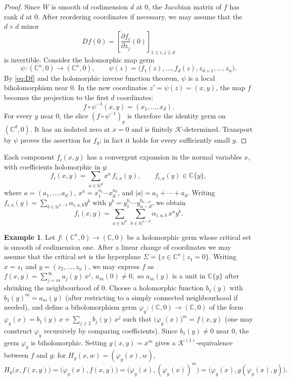 \documentclass[10pt,twoside]{amsart}
\numberwithin{equation}{section}
\theoremstyle{definition}
\newtheorem{example}[proposition]{Example}
\theoremstyle{remark}
\begin{document}
\begin{proof}
Since $W$ is smooth of codimension $d$ at $0$, the Jacobian matrix of $f$ has rank $d$ at $0$.
After reordering coordinates if necessary, we may assume that the $d\times d$ minor
\begin{equation}\label{eq:Df}
Df(0)=\left[\frac{\partial f_i}{\partial z_j}(0)\right]_{1\leq i,j\leq d}
\end{equation}
is invertible.
Consider the holomorphic map germ
\[
\psi:(\mathbb{C}^n,0)\to(\mathbb{C}^n,0),
\qquad
\psi(z)=\bigl(f_1(z),\ldots,f_d(z),z_{d+1},\ldots,z_n\bigr).
\]
By \eqref{eq:Df} and the holomorphic inverse function theorem, $\psi$ is a local biholomorphism near $0$.
In the new coordinates $z'=\psi(z)=(x,y)$, the map $f$ becomes the projection to the first $d$ coordinates:
\[
f\circ \psi^{-1}(x,y)=(x_1,\ldots,x_d).
\]
For every $y$ near $0$, the slice $(f\circ\psi^{-1})_y$ is therefore the identity germ on $(\mathbb C^d,0)$. It has an isolated zero at $x=0$ and is finitely $\mathcal K$-determined. Transport by $\psi$ proves the assertion for $f_y$; in fact it holds for every sufficiently small $y$.
\end{proof}

Each component $f_i(x,y)$ has a convergent expansion in the normal variables $x$, with coefficients holomorphic in $y$:
\begin{equation}\label{eq:series-x}
f_i(x,y)=\sum_{a\in\mathbb{N}^d} x^a\, f_{i,a}(y),
\qquad
f_{i,a}(y)\in \mathbb{C}\{y\},
\end{equation}
where $a=(a_1,\ldots,a_d)$, $x^a=x_1^{a_1}\cdots x_d^{a_d}$, and $|a|=a_1+\cdots+a_d$.
Writing $f_{i,a}(y)=\sum_{b\in\mathbb{N}^{n-d}}\alpha_{i,a,b}y^b$ with $y^b=y_1^{b_1}\cdots y_{n-d}^{b_{n-d}}$, we obtain
\begin{equation}\label{eq:double-series}
f_i(x,y)=\sum_{a\in\mathbb{N}^d}\ \sum_{b\in\mathbb{N}^{n-d}} \alpha_{i,a,b}\, x^a y^b.
\end{equation}

\begin{example}
Let $f:(\mathbb{C}^n,0)\to(\mathbb{C},0)$ be a holomorphic germ whose critical set is smooth of codimension one.
After a linear change of coordinates we may assume that the critical set is the hyperplane
$
\Sigma=\{z\in\mathbb{C}^n\mid z_1=0\}.
$
Writing $x=z_1$ and $y=(z_2,\ldots,z_n)$, we may express $f$ as
$
f(x,y)=\sum_{j=m}^{\infty} a_j(y)\,x^j,\ 
a_m(0)\neq 0,
$
so $a_m(y)$ is a unit in $\mathbb{C}\{y\}$ after shrinking the neighbourhood of $0$.
Choose a holomorphic function $b_1(y)$ with $b_1(y)^m=a_m(y)$ (after restricting to a simply connected neighbourhood if needed),
and define a biholomorphism germ $\varphi_y:(\mathbb{C},0)\to(\mathbb{C},0)$ of the form
$
\varphi_y(x)=b_1(y)\,x+\sum_{j\geq 2} b_j(y)\,x^j
$
such that $\bigl(\varphi_y(x)\bigr)^m=f(x,y)$ (one may construct $\varphi_y$ recursively by comparing coefficients).
Since $b_1(y)\neq0$ near $0$, the germ $\varphi_y$ is biholomorphic. Setting $g(x,y)=x^m$ gives a $\mathcal K^{(1)}$-equivalence between $f$ and $g$: for $H_y(x,w)=(\varphi_y(x),w)$,
\[
H_y\bigl(x,f(x,y)\bigr)=\bigl(\varphi_y(x),f(x,y)\bigr)=\bigl(\varphi_y(x),(\varphi_y(x))^m\bigr)
=\bigl(\varphi_y(x),g(\varphi_y(x),y)\bigr).
\]
\end{example}
\end{document}
